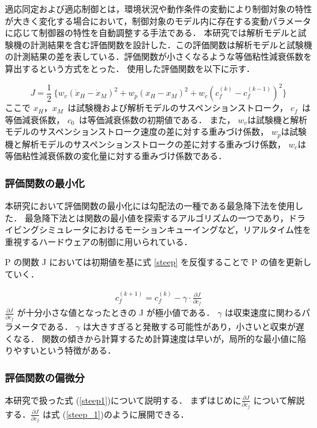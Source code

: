 \documentclass[a4paper,12pt]{article_vdlab_sotsuron}
\begin{document}
適応同定および適応制御とは，環境状況や動作条件の変動により制御対象の特性が大きく変化する場合において，制御対象のモデル内に存在する変動パラメータに応じて制御器の特性を自動調整する手法である\cite{tt}．
本研究では解析モデルと試験機の計測結果を含む評価関数を設計した．この評価関数は解析モデルと試験機の計測結果の差を表している．評価関数が小さくなるような等価粘性減衰係数を算出するという方式をとった．
使用した評価関数を以下に示す．

\vspace{-2mm}
\begin{equation}
J=\frac{1}{2}\ \{w_v(\dot{x}_H-\dot{x}_M)^2 + w_p(x_H - x_M)^2 + w_c(c^{(k)}_f - c^{(k-1)}_f)^2\}
\end{equation}
ここで
$x_H$，$x_M$~は試験機および解析モデルのサスペンションストローク，
$c_f$~は等価減衰係数，
$c_0$~は等価減衰係数の初期値である．
また，
$w_v$は試験機と解析モデルのサスペンションストローク速度の差に対する重みづけ係数，
$w_p$は試験機と解析モデルのサスペンションストロークの差に対する重みづけ係数，
$w_c$は等価粘性減衰係数の変化量に対する重みづけ係数である．

\subsubsection{評価関数の最小化}
本研究において評価関数の最小化には勾配法の一種である最急降下法を使用した．
最急降下法とは関数の最小値を探索するアルゴリズムの一つであり，ドライビングシミュレータにおけるモーションキューイングなど，リアルタイム性を重視するハードウェアの制御に用いられている\cite{MC}．

P の関数 J においては初期値を基に式 \ref{steep} を反復することで P の値を更新していく．

\vspace{-2mm}
\begin{eqnarray}
 c^{(k+1)}_{f} = c^{(k)}_{f} - \gamma \cdotp \frac{\partial J}{\partial c_{f}}
 \label{steep}
\end{eqnarray}
$\frac{\partial J}{\partial c_{f}}$ が十分小さな値となったときの J が極小値である．
$\gamma$ は収束速度に関わるパラメータである．
$\gamma$ は大きすぎると発散する可能性があり，小さいと収束が遅くなる．
関数の傾きから計算するため計算速度は早いが，局所的な最小値に陥りやすいという特徴がある．
\newpage
\subsubsection{評価関数の偏微分}
本研究で扱った式 (\ref{steep1})について説明する．
まずはじめに$\frac{\partial J}{\partial c_{f}}$ について解説する．$\frac{\partial J}{\partial c_{f}}$ は式 (\ref{steep_1})のように展開できる．
\end{document}
